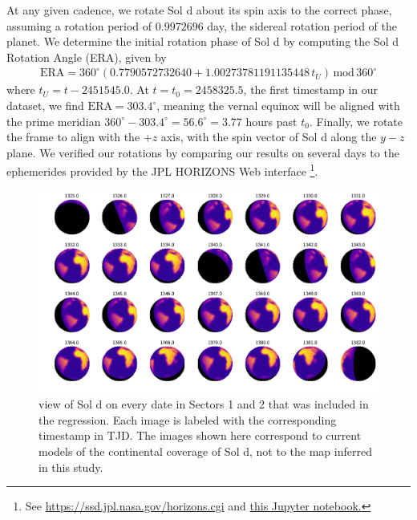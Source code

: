 \documentclass[modern]{aastex62}
\begin{document}
At any given cadence, we rotate Sol d about its spin axis to the correct phase,
assuming a rotation period of $0.9972696$ day, the sidereal rotation period
of the planet. We determine the initial rotation
phase of Sol d by computing the Sol d Rotation Angle (ERA), given by \citep{Urban2013}
%
\begin{align}
\mathrm{ERA} = 360^\circ(0.7790572732640 + 1.00273781191135448 \, t_U) \, \mathrm{mod} \, 360^\circ
\end{align}
%
where $t_U = t - 2451545.0$. At $t = t_0 = 2458325.5$, the first timestamp in our dataset,
we find $\mathrm{ERA} = 303.4^\circ$, meaning the vernal equinox will be aligned with
the prime meridian $360^\circ - 303.4^\circ = 56.6^\circ = 3.77$ hours past $t_0$.
%
Finally, we rotate the frame to align
\TESS with the $+z$ axis, with the spin vector of Sol d along the $y-z$ plane.
We verified our rotations by comparing our results on several days to the
ephemerides provided by the JPL HORIZONS Web interface%
\footnote{See \url{https://ssd.jpl.nasa.gov/horizons.cgi} and 
\href{https://github.com/rodluger/earthshine/blob/master/notebooks/SanityCheck.ipynb}{this
Jupyter notebook.}}.

\begin{figure}[t!]
    \begin{centering}
    \includegraphics[width=\linewidth]{figures/phases.pdf}
    \caption{\label{fig:phases}
             \TESS view of Sol d on every date in Sectors 1
             and 2 that was included in the regression. Each image is
             labeled with the corresponding timestamp in TJD. The images
             shown here correspond to current models of the continental coverage
             of Sol d, not to the map inferred in this study.
             }
    \end{centering}
\end{figure}
\end{document}

